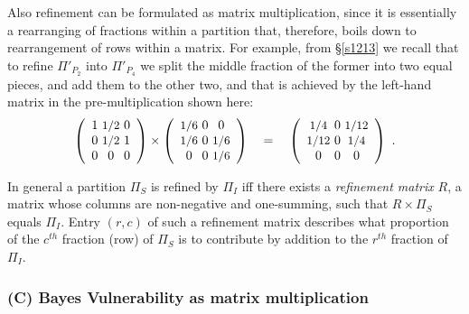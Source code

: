 \documentclass[runningheads]{llncs}
\newcommand\Sec[1] {Sec.~\ref{#1}}
\renewcommand\Sec[1] {\S\ref{#1}}
\newcommand\Wide[1] {~~~#1~~~}
\begin{document}
Also refinement can be formulated as matrix multiplication, since it is essentially a rearranging of fractions within a partition that, therefore, boils down to rearrangement of rows within a matrix. For example, from \Sec{s1213} we recall that to refine $\Pi'_{P_2}$ into $\Pi'_{P_4}$ we split the middle fraction of the former into two equal pieces, and add them to the other two, and that is achieved by the left-hand matrix in the pre-multiplication shown here:
\[
  \left(\begin{array}{c@{~}c@{~}c}
        1 & \IFrac{1}{2} & 0 \\
        0 & \IFrac{1}{2} & 1 \\
        0 & 0 & 0
  \end{array}\right)
 \times
  \left (\begin{array}{c@{~}c@{~}c}
          \IFrac{1}{6} & 0 &  0 \\
          \IFrac{1}{6} & 0 & \IFrac{1}{6} \\
          0 & 0 & \IFrac{1}{6}
         \end{array}
  \right)
 \Wide{=}
  \left (\begin{array}{c@{~}c@{~}c}
         \IFrac{1}{4}  & 0 & \IFrac{1}{12}\\
         \IFrac{1}{12} & 0 & \IFrac{1}{4} \\
         0 & 0  & 0
        \end{array}
  \right)~.
\]

In general a partition $\Pi_S$ is refined by $\Pi_I$ iff there exists a \emph{refinement matrix} $R$, a matrix whose columns are non-negative and one-summing, such that $R{\times}\Pi_S$ equals $\Pi_I$. Entry $(r,c)$ of such a refinement matrix describes what proportion of the $c^{\mathit th}$ fraction (row) of $\Pi_S$ is to contribute by addition to the $r^{\mathit th}$ fraction of $\Pi_I$.

\subsubsection{(C) Bayes Vulnerability as matrix multiplication}
\end{document}
